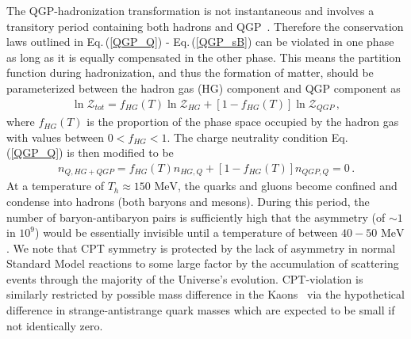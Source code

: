 \documentclass[universe,article,submit,moreauthors,pdftex,a4paper]{Definitions/mdpi}
\newcommand{\MeV}{\text{ MeV}}
\newcommand{\req}[1]{Eq.\,(\ref{#1})}
\begin{document}
The QGP-hadronization transformation is not instantaneous and involves a transitory period containing both hadrons and QGP~\cite{Rafelski:2019twp}. Therefore the conservation laws outlined in \req{QGP_Q} - \req{QGP_sB} can be violated in one phase as long as it is equally compensated in the other phase. This means the partition function during hadronization, and thus the formation of matter, should be parameterized between the hadron gas (HG) component and QGP component as
\begin{align}\label{QGP_trans}
 \ln\mathcal{Z}_{tot}=f_{HG}(T)\ln\mathcal{Z}_{HG}+\left[1-f_{HG}(T)\right]\ln\mathcal{Z}_{QGP}\,,
\end{align}
where $f_{HG}(T)$ is the proportion of the phase space occupied by the hadron gas with values between $0<f_{HG}<1$. The charge neutrality condition \req{QGP_Q} is then modified to be
\begin{align}\label{QGP_transQ}
 n_{Q,HG+QGP}=f_{HG}(T)n_{HG,Q}+\left[1-f_{HG}(T)\right]n_{QGP,Q}=0\,.
\end{align}
At a temperature of $T_{h}\approx150\MeV$, the quarks and gluons become confined and condense into hadrons (both baryons and mesons). During this period, the number of baryon-antibaryon pairs is sufficiently high that the asymmetry (of $\sim1$ in $10^{9}$) would be essentially invisible until a temperature of between $40-50\MeV$. We note that CPT symmetry is protected by the lack of asymmetry in normal Standard Model reactions to some large factor by the accumulation of scattering events through the majority of the Universe's evolution. CPT-violation is similarly restricted by possible mass difference in the Kaons~\cite{Fromerth:2002dv} via the hypothetical difference in strange-antistrange quark masses which are expected to be small if not identically zero.
\end{document}
